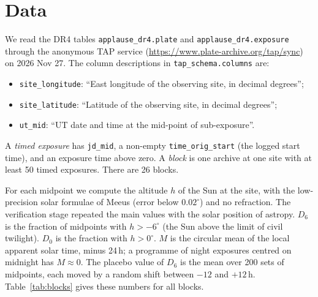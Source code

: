 \documentclass[11pt]{article}
\begin{document}
\section{Data}
We read the DR4 tables \texttt{applause\_dr4.plate} and \texttt{applause\_dr4.exposure} through the anonymous TAP service (\url{https://www.plate-archive.org/tap/sync}) on 2026 Nov 27. The column descriptions in \texttt{tap\_schema.columns} are:
\begin{itemize}
\item \texttt{site\_longitude}: ``East longitude of the observing site, in decimal degrees'';
\item \texttt{site\_latitude}: ``Latitude of the observing site, in decimal degrees'';
\item \texttt{ut\_mid}: ``UT date and time at the mid-point of sub-exposure''.
\end{itemize}
A \emph{timed exposure} has \texttt{jd\_mid}, a non-empty \texttt{time\_orig\_start} (the logged start time), and an exposure time above zero. A \emph{block} is one archive at one site with at least 50 timed exposures. There are 26 blocks.

For each midpoint we compute the altitude $h$ of the Sun at the site, with the low-precision solar formulae of Meeus (error below $0.02^\circ$) and no refraction. The verification stage repeated the main values with the solar position of astropy. $D_6$ is the fraction of midpoints with $h>-6^\circ$ (the Sun above the limit of civil twilight). $D_0$ is the fraction with $h>0^\circ$. $M$ is the circular mean of the local apparent solar time, minus 24\,h; a programme of night exposures centred on midnight has $M\approx0$. The placebo value of $D_6$ is the mean over 200 sets of midpoints, each moved by a random shift between $-12$ and $+12$\,h. Table~\ref{tab:blocks} gives these numbers for all blocks.
\end{document}
